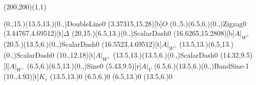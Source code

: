 \unitlength=1bp%

\begin{feynartspicture}(200,200)(1,1)

\FADiagram{}
\FAProp(0.,15.)(13.5,13.)(0.,){DoubleLine}{0}
\FALabel(3.37315,15.28)[b]{$O$}
\FAProp(0.,5.)(6.5,6.)(0.,){Zigzag}{0}
\FALabel(3.44767,4.69512)[t]{$\Delta$}
\FAProp(20,15.)(6.5,13.)(0.,){ScalarDash}{0}
\FALabel(16.6265,15.2808)[b]{$A|_{W^\perp}$}
\FAProp(20,5.)(13.5,6.)(0.,){ScalarDash}{0}
\FALabel(16.5523,4.69512)[t]{$A|_{W^\perp}$}
\FAProp(13.5,13.)(6.5,13.)(0.,){ScalarDash}{0}
\FALabel(10.,12.18)[t]{$A|_{W^\perp}$}
\FAProp(13.5,13.)(13.5,6.)(0.,){ScalarDash}{0}
\FALabel(14.32,9.5)[l]{$A|_{W^\perp}$}
\FAProp(6.5,6.)(6.5,13.)(0.,){Sine}{0}
\FALabel(5.43,9.5)[r]{$A|_V$}
\FAProp(6.5,6.)(13.5,6.)(0.,){BandSine}{-1}
\FALabel(10.,4.93)[t]{$K_\varepsilon$}
\FAVert(13.5,13.){0}
\FAVert(6.5,6.){0}
\FAVert(6.5,13.){0}
\FAVert(13.5,6.){0}
\end{feynartspicture}

